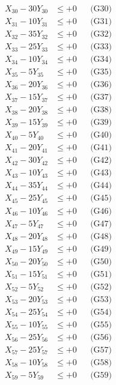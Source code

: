 \documentclass[a4paper,10pt]{article}
\begin{document}
{\begin{align}
\allowbreak
X_{30} - 30Y_{30} &\leq +0 && \text{(G30)} \\
X_{31} - 10Y_{31} &\leq +0 && \text{(G31)} \\
X_{32} - 35Y_{32} &\leq +0 && \text{(G32)} \\
X_{33} - 25Y_{33} &\leq +0 && \text{(G33)} \\
X_{34} - 10Y_{34} &\leq +0 && \text{(G34)} \\
X_{35} - 5Y_{35} &\leq +0 && \text{(G35)} \\
X_{36} - 20Y_{36} &\leq +0 && \text{(G36)} \\
X_{37} - 15Y_{37} &\leq +0 && \text{(G37)} \\
X_{38} - 20Y_{38} &\leq +0 && \text{(G38)} \\
X_{39} - 15Y_{39} &\leq +0 && \text{(G39)} \\
\allowbreak
X_{40} - 5Y_{40} &\leq +0 && \text{(G40)} \\
X_{41} - 20Y_{41} &\leq +0 && \text{(G41)} \\
X_{42} - 30Y_{42} &\leq +0 && \text{(G42)} \\
X_{43} - 10Y_{43} &\leq +0 && \text{(G43)} \\
X_{44} - 35Y_{44} &\leq +0 && \text{(G44)} \\
X_{45} - 25Y_{45} &\leq +0 && \text{(G45)} \\
X_{46} - 10Y_{46} &\leq +0 && \text{(G46)} \\
X_{47} - 5Y_{47} &\leq +0 && \text{(G47)} \\
X_{48} - 20Y_{48} &\leq +0 && \text{(G48)} \\
X_{49} - 15Y_{49} &\leq +0 && \text{(G49)} \\
\allowbreak
X_{50} - 20Y_{50} &\leq +0 && \text{(G50)} \\
X_{51} - 15Y_{51} &\leq +0 && \text{(G51)} \\
X_{52} - 5Y_{52} &\leq +0 && \text{(G52)} \\
X_{53} - 20Y_{53} &\leq +0 && \text{(G53)} \\
X_{54} - 25Y_{54} &\leq +0 && \text{(G54)} \\
X_{55} - 10Y_{55} &\leq +0 && \text{(G55)} \\
X_{56} - 25Y_{56} &\leq +0 && \text{(G56)} \\
X_{57} - 25Y_{57} &\leq +0 && \text{(G57)} \\
X_{58} - 10Y_{58} &\leq +0 && \text{(G58)} \\
X_{59} - 5Y_{59} &\leq +0 && \text{(G59)} \\

\end{align}}
\end{document}
